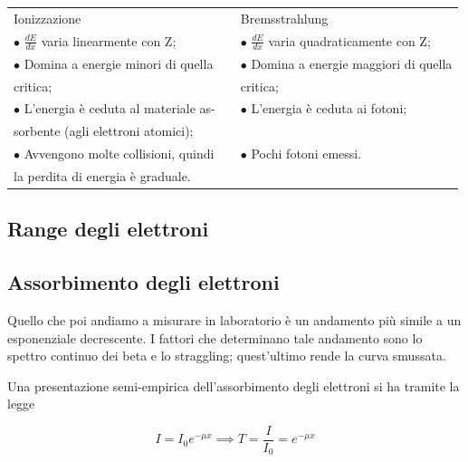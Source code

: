\begin{center}
    \begin{tabular}{p{6.7cm}p{0.8cm}p{6.7cm}}
        \hspace{2cm}Ionizzazione & & \hspace{2cm}Bremsstrahlung\\[0.5cm]
        $\bullet$ $\displaystyle \frac{d E}{d x}$ varia linearmente con Z\footnotemark; & & $\bullet$ $\displaystyle \frac{d E}{d x}$ varia quadraticamente con Z;\\[0.5cm]
        $\bullet$ Domina a energie minori di quella & & $\bullet$ Domina a energie maggiori di quella\\
        \hspace{0.36cm}critica; & & \hspace{0.32cm}critica;\\[0.2cm]
        $\bullet$ L'energia è ceduta al materiale as- & & $\bullet$ L'energia è ceduta ai fotoni;\\
        \hspace{0.36cm}sorbente (agli elettroni atomici); & &\\[0.2cm]
        $\bullet$ Avvengono molte collisioni, quindi & & $\bullet$ Pochi fotoni emessi.\\
        \hspace{0.36cm}la perdita di energia è graduale. & &
    \end{tabular}
\end{center}


\subsection{Range degli elettroni}

\subsection{Assorbimento degli elettroni}
Quello che poi andiamo a misurare in laboratorio è un andamento più simile a un esponenziale decrescente. I fattori che determinano tale andamento sono lo spettro continuo dei beta e lo straggling; quest'ultimo rende la curva smussata.

Una presentazione semi-empirica dell'assorbimento degli elettroni si ha tramite la legge

$$I=I_0 e^{-\mu x}
\implies
T=\frac{I}{I_0}=e^{-\mu x}$$

